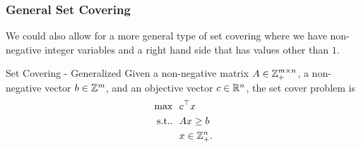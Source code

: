 \documentclass[../open-optimization/open-optimization.tex]{subfiles}
\begin{document}
\subsubsection{General Set Covering}
We could also allow for a more general type of set covering where we have non-negative integer variables and a right hand side that has values other than $1$.
\begin{general}{Set Covering - Generalized}{\npcomplete}
\label{general:set-covering-alternate}
Given a non-negative matrix $A \in {\mathbb{Z}}_+^{m \times n}$, a non-negative vector $b \in {\mathbb{Z}}^m$, and an objective vector $c \in {\mathbb{R}}^n$, the set cover problem is
\begin{equation}
\begin{split}
\max \ \ & c^\top x\\
\text{s.t.}. \ \ & Ax \geq b \\
& x \in{\mathbb{Z}}^n_+.
\end{split}
\end{equation}
\end{general}
\end{document}

